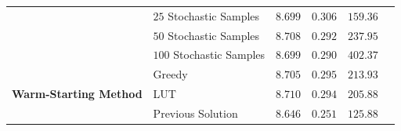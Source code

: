 \begin{tabular}{l|lllll}
 & $25$ Stochastic Samples & $8.699$ \cellcolor[gray]{0.733} & $0.306$ \cellcolor[gray]{0.567} & $159.36$ \cellcolor[gray]{0.667}  \\ 
 & $50$ Stochastic Samples & $8.708$ \cellcolor[gray]{0.6} & $0.292$ \cellcolor[gray]{0.767} & $237.95$ \cellcolor[gray]{0.5}  \\ 
 & $100$ Stochastic Samples & $8.699$  \cellcolor[gray]{0.767} & $0.290$ \cellcolor[gray]{0.867} & $402.37$ \cellcolor[gray]{0.4}  \\ \hline 
\multirow{3}{*}{\textbf{Warm-Starting Method}} & Greedy & $8.705$ \cellcolor[gray]{0.667} & $0.295$ \cellcolor[gray]{0.6} & $213.93$ \cellcolor[gray]{0.567} \\ 
 & LUT & $8.710$ \cellcolor[gray]{0.533} & $0.294$ \cellcolor[gray]{0.7} & $205.88$ \cellcolor[gray]{0.6}  \\ 
 & Previous Solution & $8.646$  \cellcolor[gray]{0.933} & $0.251$ \cellcolor[gray]{0.933} & $125.88$ \cellcolor[gray]{0.7}  \\ \hline 
\end{tabular}